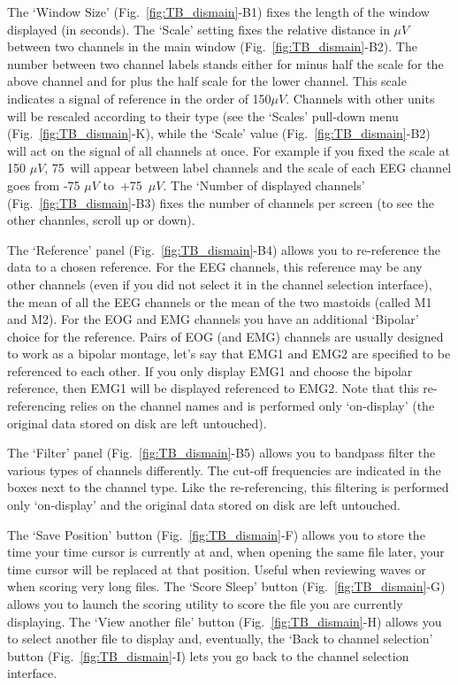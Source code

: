 \documentclass[a4paper,titlepage]{article}
\begin{document}
The `Window Size' (Fig.~\ref{fig:TB_dismain}-B1) fixes the length of the window displayed (in seconds).  The `Scale' setting fixes the relative distance in $\mu V$ between two channels in the main window (Fig.~\ref{fig:TB_dismain}-B2). The number between two channel labels stands either for minus half the scale for the above channel and for plus the half scale for the lower channel. 
This scale indicates a signal of reference in the order of 150$\mu V$. Channels with other units will be rescaled according to their type (see the `Scales' pull-down menu (Fig.~\ref{fig:TB_dismain}-K), while the `Scale' value (Fig.~\ref{fig:TB_dismain}-B2) will act on the signal of all channels at once.
For example if you fixed the scale at 150 $\mu V$, 75~will appear between label channels and the scale of each EEG channel goes from  -75 $\mu V$ to~+75~$\mu V$. The `Number of displayed channels' (Fig.~\ref{fig:TB_dismain}-B3) fixes the number of channels per screen (to see the other channles, scroll up or down). 

The `Reference' panel (Fig.~\ref{fig:TB_dismain}-B4) allows you to re-reference the data to a chosen reference. For the EEG channels, this reference may be any other channels (even if you did not select it in the channel selection interface), the mean of all the EEG channels or the mean of the two mastoids (called M1 and M2). For the EOG and EMG channels you have an additional `Bipolar' choice for the reference. Pairs of EOG (and EMG) channels are usually designed to work as a bipolar montage, let's say that EMG1 and EMG2 are specified to be referenced to each other. If you only display EMG1 and choose the bipolar reference, then EMG1 will be displayed referenced to EMG2. Note that this re-referencing relies on the channel names and is performed only `on-display' (the original data stored on disk are left untouched).

The `Filter' panel (Fig.~\ref{fig:TB_dismain}-B5) allows you to bandpass filter the various types of channels differently. The cut-off frequencies are indicated in the boxes next to the channel type. Like the re-referencing, this filtering is performed only `on-display' and the original data stored on disk are left untouched. 

The `Save Position' button  (Fig.~\ref{fig:TB_dismain}-F) allows you to store the time your time cursor is currently at and, when opening the same file later, your time cursor will be replaced at that position. Useful when reviewing waves or when scoring very long files.
The `Score Sleep' button (Fig.~\ref{fig:TB_dismain}-G) allows you to launch the scoring utility to score the file you are currently displaying. The `View another file' button (Fig.~\ref{fig:TB_dismain}-H) allows you to select another file to display and, eventually, the `Back to channel selection' button (Fig.~\ref{fig:TB_dismain}-I) lets you go back to the channel selection interface.
\end{document}
